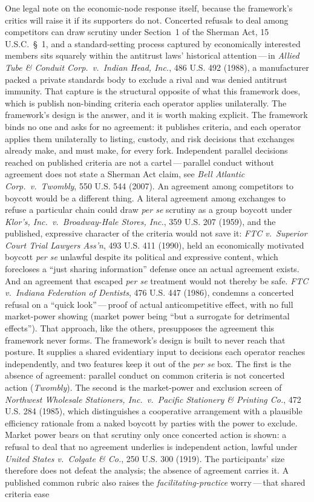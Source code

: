\documentclass[11pt, twoside, openright]{book}
\begin{document}
One legal note on the economic-node response itself, because the framework's critics will raise it if its supporters do not. Concerted refusals to deal among competitors can draw scrutiny under Section~1 of the Sherman Act, 15 U.S.C.~\S~1, and a standard-setting process captured by economically interested members sits squarely within the antitrust laws' historical attention\,---\,in \textit{Allied Tube \& Conduit Corp.~v.~Indian Head, Inc.}, 486 U.S. 492 (1988), a manufacturer packed a private standards body to exclude a rival and was denied antitrust immunity. That capture is the structural opposite of what this framework does, which is publish non-binding criteria each operator applies unilaterally. The framework's design is the answer, and it is worth making explicit. The framework binds no one and asks for no agreement: it publishes criteria, and each operator applies them unilaterally to listing, custody, and risk decisions that exchanges already make, and must make, for every fork. Independent parallel decisions reached on published criteria are not a cartel\,---\,parallel conduct without agreement does not state a Sherman Act claim, see \textit{Bell Atlantic Corp.~v.~Twombly}, 550 U.S. 544 (2007). An agreement among competitors to boycott would be a different thing. A literal agreement among exchanges to refuse a particular chain could draw \textit{per se} scrutiny as a group boycott under \textit{Klor's, Inc.~v.~Broadway-Hale Stores, Inc.}, 359 U.S. 207 (1959), and the published, expressive character of the criteria would not save it: \textit{FTC v.~Superior Court Trial Lawyers Ass'n}, 493 U.S. 411 (1990), held an economically motivated boycott \textit{per se} unlawful despite its political and expressive content, which forecloses a ``just sharing information'' defense once an actual agreement exists. And an agreement that escaped \textit{per se} treatment would not thereby be safe. \textit{FTC v.~Indiana Federation of Dentists}, 476 U.S. 447 (1986), condemns a concerted refusal on a ``quick look''\,---\,proof of actual anticompetitive effect, with no full market-power showing (market power being ``but a surrogate for detrimental effects''). That approach, like the others, presupposes the agreement this framework never forms. The framework's design is built to never reach that posture. It supplies a shared evidentiary input to decisions each operator reaches independently, and two features keep it out of the \textit{per se} box. The first is the absence of agreement: parallel conduct on common criteria is not concerted action (\textit{Twombly}). The second is the market-power and exclusion screen of \textit{Northwest Wholesale Stationers, Inc.~v.~Pacific Stationery \& Printing Co.}, 472 U.S. 284 (1985), which distinguishes a cooperative arrangement with a plausible efficiency rationale from a naked boycott by parties with the power to exclude. Market power bears on that scrutiny only once concerted action is shown: a refusal to deal that no agreement underlies is independent action, lawful under \textit{United States v.~Colgate \& Co.}, 250 U.S. 300 (1919). The participants' size therefore does not defeat the analysis; the absence of agreement carries it. A published common rubric also raises the \textit{facilitating-practice} worry\,---\,that shared criteria ease 
\end{document}
